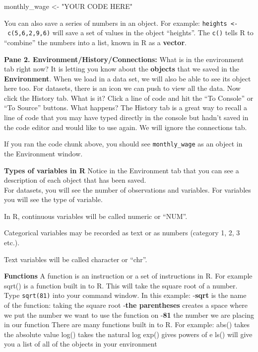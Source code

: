 \documentclass[
]{article}
\newenvironment{Shaded}{\begin{snugshade}}{\end{snugshade}}
\newcommand{\NormalTok}[1]{#1}
\newcommand{\OtherTok}[1]{\textcolor[rgb]{0.56,0.35,0.01}{#1}}
\newcommand{\StringTok}[1]{\textcolor[rgb]{0.31,0.60,0.02}{#1}}
\begin{document}
\begin{Shaded}
\begin{Highlighting}[]
\NormalTok{monthly\_wage }\OtherTok{\textless{}{-}} \StringTok{"YOUR CODE HERE"}
\end{Highlighting}
\end{Shaded}

You can also save a series of numbers in an object. For example:
\texttt{heights\ \textless{}-\ c(5,6,2,9,6)} will save a set of values
in the object ``heights''. The \texttt{c()} tells R to ``combine'' the
numbers into a list, known in R as a \textbf{vector}.

\textbf{Pane 2. Environment/History/Connections:} What is in the
environment tab right now? It is letting you know about the
\textbf{objects} that we saved in the \textbf{Environment}. When we load
in a data set, we will also be able to see its object here too. For
datasets, there is an icon we can push to view all the data. Now click
the History tab. What is it? Click a line of code and hit the ``To
Console'' or ``To Source'' buttons. What happens? The History tab is a
great way to recall a line of code that you may have typed directly in
the console but hadn't saved in the code editor and would like to use
again. We will ignore the connections tab.

If you ran the code chunk above, you should see \texttt{monthly\_wage}
as an object in the Environment window.

\textbf{Types of variables in R} Notice in the Environment tab that you
can see a description of each object that has been saved.\\
For datasets, you will see the number of observations and variables. For
variables you will see the type of variable.

In R, continuous variables will be called numeric or ``NUM''.

Categorical variables may be recorded as text or as numbers (category 1,
2, 3 etc.).

Text variables will be called character or ``chr''.

\textbf{Functions} A function is an instruction or a set of instructions
in R. For example sqrt() is a function built in to R. This will take the
square root of a number. Type \texttt{sqrt(81)} into your command
window. In this example: -\textbf{sqrt} is the name of the function:
taking the square root -\textbf{the parentheses} creates a space where
we put the number we want to use the function on -\textbf{81} the number
we are placing in our function There are many functions built in to R.
For example: abs() takes the absolute value log() takes the natural log
exp() gives powers of e ls() will give you a list of all of the objects
in your environment
\end{document}

